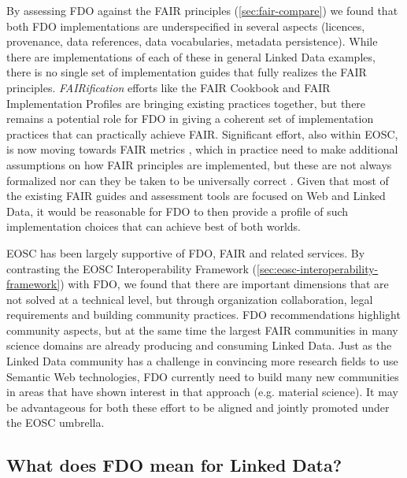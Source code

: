 \documentclass[fleqn,10pt,lineno]{wlpeerjlua}
\begin{document}
By assessing FDO against the FAIR principles (\vref*{sec:fair-compare}) we found that both FDO implementations are underspecified in several aspects (licences, provenance, data references, data vocabularies, metadata persistence). While there are implementations of each of these in general Linked Data examples, there is no single set of implementation guides that fully realizes the FAIR principles. \emph{FAIRification} efforts like the FAIR Cookbook \autocite{faircookbook} and FAIR Implementation Profiles \autocite{FIP} are bringing existing practices together, but there remains a potential role for FDO in giving a coherent set of implementation practices that can practically achieve FAIR. Significant effort, also within EOSC, is now moving towards FAIR metrics \autocite{Devaraju_2021}, which in practice need to make additional assumptions on how FAIR principles are implemented, but these are not always formalized \autocite{10.5281/zenodo.7463421} nor can they be taken to be universally correct \autocite{10.5281/zenodo.7848102}. Given that most of the existing FAIR guides and assessment tools are focused on Web and Linked Data, it would be reasonable for FDO to then provide a profile of such implementation choices that can achieve best of both worlds.

EOSC has been largely supportive of FDO, FAIR and related services. By contrasting the EOSC Interoperability Framework (\vref*{sec:eosc-interoperability-framework}) with FDO, we found that there are important dimensions that are not solved at a technical level, but through organization collaboration, legal requirements and building community practices. FDO recommendations highlight community aspects, but at the same time the largest FAIR communities in many science domains are already producing and consuming Linked Data. Just as the Linked Data community has a challenge in convincing more research fields to use Semantic Web technologies, FDO currently need to build many new communities in areas that have shown interest in that approach (e.g. material science).  It may be advantageous for both these effort to be aligned and jointly promoted under the EOSC umbrella. 




\subsection*{What does FDO mean for Linked Data?}\label{sec:what-does-it-mean-for-linked-data}
\end{document}
